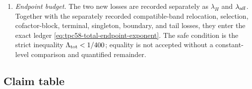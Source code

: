 \begin{enumerate}[label=\textup{(A\arabic*)},leftmargin=3.2em]
       that baseline are removed.  Coefficient-dependent zeros may shrink a
       distinguished support, but they do not redefine \(E_H\), its rank, or
       the uniform constants.  The high residual identification also uses
       the same \(p>y\) cutoff on both the Walsh and terminal sides.  At the
       endpoint this cutoff forces the smaller cofactor range
       \eqref{eq:tpc58-compatible-cofactor-ceiling}; occupancy of that range
       is not inferred from the old \(R\asymp J\) block.
 \item \emph{Endpoint budget.}
       The two new losses are recorded separately as
       \(\lambda_H\) and \(\lambda_{\rm aff}\).  Together with the separately
       recorded compatible-band relocation, selection, cofactor-block,
       terminal, singleton, boundary, and tail losses, they enter the exact
       ledger
       \eqref{eq:tpc58-total-endpoint-exponent}.  The safe condition is the
       strict inequality
       \(\Lambda_{\rm tot}<1/400\); equality is not accepted without a
       constant-level comparison and quantified remainder.
\end{enumerate}

\subsection{Claim table}

